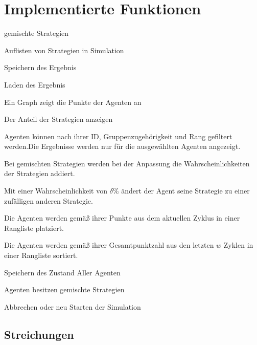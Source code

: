 \section{Implementierte Funktionen}

\item gemischte Strategien 

\item Auflisten von Strategien in Simulation

\item Speichern des Ergebnis

\item Laden des Ergebnis

\item Ein Graph zeigt die Punkte der Agenten an

\item Der Anteil der Strategien anzeigen

\item Agenten können nach ihrer ID, Gruppenzugehörigkeit und Rang gefiltert werden.Die Ergebnisse werden nur für die ausgewählten Agenten angezeigt.

\item Bei gemischten Strategien werden bei der Anpassung die Wahrscheinlichkeiten der Strategien addiert.

\item Mit einer Wahrscheinlichkeit von $\delta\%$ ändert der Agent seine Strategie zu einer zufälligen anderen Strategie.

\item Die Agenten werden gemäß ihrer Punkte aus dem aktuellen Zyklus in einer Rangliste platziert.

\item Die Agenten werden gemäß ihrer Gesamtpunktzahl aus den letzten $w$ Zyklen in einer Rangliste sortiert.

\item Speichern des Zustand Aller Agenten

\item Agenten besitzen gemischte Strategien

\item Abbrechen oder neu Starten der Simulation

\subsection{Streichungen}

